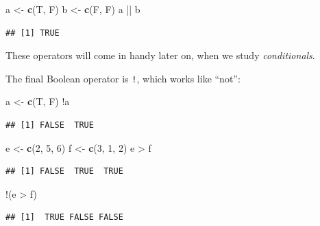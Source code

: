\documentclass[]{book}
\makeatletter
\newenvironment{Shaded}{\begin{snugshade}}{\end{snugshade}}
\newcommand{\KeywordTok}[1]{\textcolor[rgb]{0.13,0.29,0.53}{\textbf{{#1}}}}
\newcommand{\DecValTok}[1]{\textcolor[rgb]{0.00,0.00,0.81}{{#1}}}
\newcommand{\StringTok}[1]{\textcolor[rgb]{0.31,0.60,0.02}{{#1}}}
\newcommand{\NormalTok}[1]{{#1}}
\newenvironment{kframe}{%
\medskip{}
\setlength{\fboxsep}{.8em}
 \def\at@end@of@kframe{}%
 \ifinner\ifhmode%
  \def\at@end@of@kframe{\end{minipage}}%
  \begin{minipage}{\columnwidth}%
 \fi\fi%
 \def\FrameCommand##1{\hskip\@totalleftmargin \hskip-\fboxsep
 \colorbox{shadecolor}{##1}\hskip-\fboxsep
     \hskip-\linewidth \hskip-\@totalleftmargin \hskip\columnwidth}%
 \MakeFramed {\advance\hsize-\width
   \@totalleftmargin\z@ \linewidth\hsize
   \@setminipage}}%
 {\par\unskip\endMakeFramed%
 \at@end@of@kframe}
\renewenvironment{Shaded}{\begin{kframe}}{\end{kframe}}
\theoremstyle{definition}
\theoremstyle{definition}
\theoremstyle{remark}
\makeatother
\begin{document}
\begin{Shaded}
\begin{Highlighting}[]
\NormalTok{a <-}\StringTok{ }\KeywordTok{c}\NormalTok{(T, F)}
\NormalTok{b <-}\StringTok{ }\KeywordTok{c}\NormalTok{(F, F)}
\NormalTok{a ||}\StringTok{ }\NormalTok{b}
\end{Highlighting}
\end{Shaded}

\begin{verbatim}
## [1] TRUE
\end{verbatim}

These operators will come in handy later on, when we study
\emph{conditionals}.

The final Boolean operator is \texttt{!}, which works like ``not'':

\begin{Shaded}
\begin{Highlighting}[]
\NormalTok{a <-}\StringTok{ }\KeywordTok{c}\NormalTok{(T, F)}
\NormalTok{!a}
\end{Highlighting}
\end{Shaded}

\begin{verbatim}
## [1] FALSE  TRUE
\end{verbatim}

\begin{Shaded}
\begin{Highlighting}[]
\NormalTok{e <-}\StringTok{ }\KeywordTok{c}\NormalTok{(}\DecValTok{2}\NormalTok{, }\DecValTok{5}\NormalTok{, }\DecValTok{6}\NormalTok{)}
\NormalTok{f <-}\StringTok{  }\KeywordTok{c}\NormalTok{(}\DecValTok{3}\NormalTok{, }\DecValTok{1}\NormalTok{, }\DecValTok{2}\NormalTok{)}
\NormalTok{e >}\StringTok{ }\NormalTok{f}
\end{Highlighting}
\end{Shaded}

\begin{verbatim}
## [1] FALSE  TRUE  TRUE
\end{verbatim}

\begin{Shaded}
\begin{Highlighting}[]
\NormalTok{!(e >}\StringTok{ }\NormalTok{f)}
\end{Highlighting}
\end{Shaded}

\begin{verbatim}
## [1]  TRUE FALSE FALSE
\end{verbatim}
\end{document}

